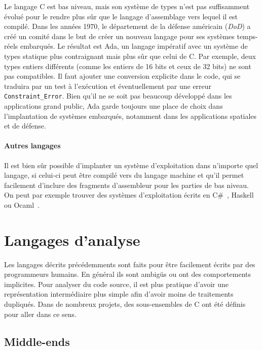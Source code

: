 Le langage C est bas niveau, mais son système de types n'est pas suffisamment
évolué pour le rendre plus sûr que le langage d'assemblage vers lequel il est
compilé. Dans les années 1970, le département de la défense américain
(\emph{DoD}) a créé un comité dans le but de créer un nouveau langage pour ses
systèmes temps-réels embarqués. Le résultat est Ada, un langage impératif avec
un système de types statique plus contraignant mais plus sûr que celui de C. Par
exemple, deux types entiers différents (comme les entiers de 16 bits et ceux de
32 bits) ne sont pas compatibles. Il faut ajouter une conversion explicite dans
le code, qui se traduira par un test à l'exécution et éventuellement par une
erreur \texttt{Constraint\_Error}. Bien qu'il ne se soit pas beaucoup développé
dans les applications grand public, Ada garde toujours une place de choix dans
l'implantation de systèmes embarqués, notamment dans les applications spatiales
et de défense.


\paragraph{Autres langages}

Il est bien sûr possible d'implanter un système d'exploitation dans n'importe
quel langage, si celui-ci peut être compilé vers du langage machine et qu'il
permet facilement d'inclure des fragments d'assembleur pour les parties de bas
niveau. On peut par exemple trouver des systèmes d'exploitation écrits en
C\#~\cite{SingularityOverview}, Haskell~\cite{HaskellOS} ou
Ocaml~\cite{unikernels}.

\section{Langages d'analyse}

Les langages décrits précédemments sont faits pour être facilement écrits par
des programmeurs humains. En général ils sont ambigüs ou ont des comportements
implicites. Pour analyser du code source, il est plus pratique d'avoir une
représentation intermédiaire plus simple afin d'avoir moins de traitements
dupliqués. Dans de nombreux projets, des sous-ensembles de C ont été définis
pour aller dans ce sens.

\subsection*{Middle-ends}

